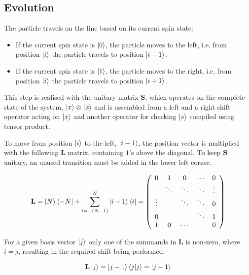 \subsection{Evolution}

The particle travels on the line based on its current spin state:
\begin{itemize}
\item If the current spin state is $\ket{0}$, the particle moves to the left, i.e. from position $\ket{i}$ the particle travels to position $\ket{i-1}$.
\item If the current spin state is $\ket{1}$, the particle moves to the right, i.e. from position $\ket{i}$ the particle travels to position $\ket{i+1}$.
\end{itemize}

This step is realised with the unitary matrix $\mathbf{S}$, which operates on the complete state of the system, $\ket{x}\otimes{}\ket{s}$ and is assembled from a left and a right shift operator acting on $\ket{x}$ and another operator for checking $\ket{s}$ compiled using tensor product.

\begin{definition}

To move from position $\ket{i}$ to the left, $\ket{i-1}$, the position vector is multiplied with the following $\mathbf{L}$ matrix, containing $1$'s above the diagonal. To keep $\mathbf{S}$ unitary, an unused transition must be added in the lower left corner.


\begin{align*}
\mathbf{L} = \ket{N}\bra{-N} + \sum\limits_{i=-(N-1)}^{N} \ket{i-1}\bra{i} =
\left(
    \begin{array}{ccccc}
        0      & 1      & 0      & \cdots & 0      \\
               & \ddots & \ddots & \ddots & \vdots \\
        \vdots &        & \ddots & \ddots & 0      \\
        0      &        &        & \ddots & 1      \\
        1      & 0      & \cdots &        & 0
      \end{array}
\right)
\end{align*}

For a given basis vector $\ket{j}$ only one of the summands in $\mathbf{L}$ is non-zero, where $i=j$, resulting in the required shift being performed.

\begin{align*}
\mathbf{L}\ket{j} = \ket{j-1}\bra{j}\ket{j} = \ket{j-1}
\end{align*}

\end{definition}

